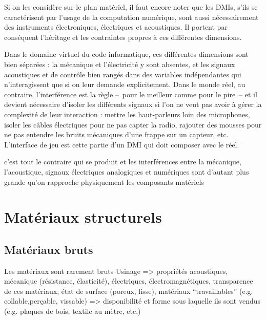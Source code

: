 \noindent Si on les considère sur le plan matériel, il faut encore noter que les \glspl{DMI}, s'ils se caractérisent par l'usage de la computation numérique, sont aussi nécessairement des instruments électroniques, électriques et acoustiques. Il portent par conséquent l'héritage et les contraintes propres à ces différentes dimensions. 

\indent Dans le domaine virtuel du code informatique, ces différentes dimensions sont bien séparées : la mécanique et l'électricité y sont absentes, et les signaux acoustiques et de contrôle bien rangés dans des variables indépendantes qui n'interagissent que si on leur demande explicitement. Dans le monde réel, au contraire, l'interférence est la règle --~pour le meilleur comme pour le pire~-- et il devient nécessaire d'isoler les différents signaux si l'on ne veut pas avoir à gérer la complexité de leur interaction : mettre les haut-parleurs loin des microphones, isoler les câbles électriques pour ne pas capter la radio, rajouter des mousses pour ne pas entendre les bruits mécaniques d'une frappe sur un capteur, etc. L'interface de jeu est cette partie d'un \gls{DMI} qui doit composer avec le réel.

 c'est tout le contraire qui se produit et les interférences entre la mécanique, l'acoustique, signaux électriques analogiques et numériques sont d'autant plus grande qu'on rapproche physiquement les composants matériels



\section{Matériaux structurels}
\label{sec:interfaces:materials}

\subsection{Matériaux bruts}

Les matériaux sont rarement bruts
Usinage
=> propriétés acoustiques, mécanique (résistance, élasticité), électriques, électromagnétiques, transparence de	ces matériaux, état de surface (poreux, lisse), matériaux ``travaillables'' (e.g. collable,perçable, vissable)
=> disponibilité et forme sous laquelle ils sont vendus (e.g. plaques de bois, textile au mètre, etc.)

